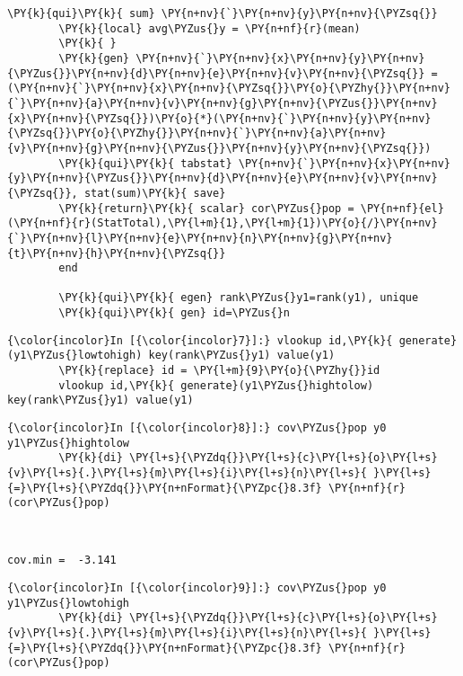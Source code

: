 \documentclass[11pt,notitlepage]{article}\usepackage[]{graphicx}\usepackage[]{color}
\makeatletter
\newenvironment{kframe}{%
 \def\at@end@of@kframe{}%
 \ifinner\ifhmode%
  \def\at@end@of@kframe{\end{minipage}}%
  \begin{minipage}{\columnwidth}%
 \fi\fi%
 \def\FrameCommand##1{\hskip\@totalleftmargin \hskip-\fboxsep
 \colorbox{shadecolor}{##1}\hskip-\fboxsep
     \hskip-\linewidth \hskip-\@totalleftmargin \hskip\columnwidth}%
 \MakeFramed {\advance\hsize-\width
   \@totalleftmargin\z@ \linewidth\hsize
   \@setminipage}}%
 {\par\unskip\endMakeFramed%
 \at@end@of@kframe}
\newenvironment{knitrout}{}{} %
\makeatother
\begin{document}
\begin{knitrout}
\begin{kframe}
\begin{Verbatim}[commandchars=\\\{\}]
        \PY{k}{qui}\PY{k}{ sum} \PY{n+nv}{`}\PY{n+nv}{y}\PY{n+nv}{\PYZsq{}}
        \PY{k}{local} avg\PYZus{}y = \PY{n+nf}{r}(mean)
        \PY{k}{	}
        \PY{k}{gen} \PY{n+nv}{`}\PY{n+nv}{x}\PY{n+nv}{y}\PY{n+nv}{\PYZus{}}\PY{n+nv}{d}\PY{n+nv}{e}\PY{n+nv}{v}\PY{n+nv}{\PYZsq{}} = (\PY{n+nv}{`}\PY{n+nv}{x}\PY{n+nv}{\PYZsq{}}\PY{o}{\PYZhy{}}\PY{n+nv}{`}\PY{n+nv}{a}\PY{n+nv}{v}\PY{n+nv}{g}\PY{n+nv}{\PYZus{}}\PY{n+nv}{x}\PY{n+nv}{\PYZsq{}})\PY{o}{*}(\PY{n+nv}{`}\PY{n+nv}{y}\PY{n+nv}{\PYZsq{}}\PY{o}{\PYZhy{}}\PY{n+nv}{`}\PY{n+nv}{a}\PY{n+nv}{v}\PY{n+nv}{g}\PY{n+nv}{\PYZus{}}\PY{n+nv}{y}\PY{n+nv}{\PYZsq{}})
        \PY{k}{qui}\PY{k}{ tabstat} \PY{n+nv}{`}\PY{n+nv}{x}\PY{n+nv}{y}\PY{n+nv}{\PYZus{}}\PY{n+nv}{d}\PY{n+nv}{e}\PY{n+nv}{v}\PY{n+nv}{\PYZsq{}}, stat(sum)\PY{k}{ save}
        \PY{k}{return}\PY{k}{ scalar} cor\PYZus{}pop = \PY{n+nf}{el}(\PY{n+nf}{r}(StatTotal),\PY{l+m}{1},\PY{l+m}{1})\PY{o}{/}\PY{n+nv}{`}\PY{n+nv}{l}\PY{n+nv}{e}\PY{n+nv}{n}\PY{n+nv}{g}\PY{n+nv}{t}\PY{n+nv}{h}\PY{n+nv}{\PYZsq{}}
        end
        
        \PY{k}{qui}\PY{k}{ egen} rank\PYZus{}y1=rank(y1), unique
        \PY{k}{qui}\PY{k}{ gen} id=\PYZus{}n
\end{Verbatim}

    \begin{Verbatim}[commandchars=\\\{\}]
{\color{incolor}In [{\color{incolor}7}]:} vlookup id,\PY{k}{ generate}(y1\PYZus{}lowtohigh) key(rank\PYZus{}y1) value(y1)
        \PY{k}{replace} id = \PY{l+m}{9}\PY{o}{\PYZhy{}}id
        vlookup id,\PY{k}{ generate}(y1\PYZus{}hightolow) key(rank\PYZus{}y1) value(y1)
\end{Verbatim}

    \begin{Verbatim}[commandchars=\\\{\}]
{\color{incolor}In [{\color{incolor}8}]:} cov\PYZus{}pop y0 y1\PYZus{}hightolow
        \PY{k}{di} \PY{l+s}{\PYZdq{}}\PY{l+s}{c}\PY{l+s}{o}\PY{l+s}{v}\PY{l+s}{.}\PY{l+s}{m}\PY{l+s}{i}\PY{l+s}{n}\PY{l+s}{ }\PY{l+s}{=}\PY{l+s}{\PYZdq{}}\PY{n+nFormat}{\PYZpc{}8.3f} \PY{n+nf}{r}(cor\PYZus{}pop)
\end{Verbatim}

    \begin{Verbatim}[commandchars=\\\{\}]


cov.min =  -3.141

    \end{Verbatim}

    \begin{Verbatim}[commandchars=\\\{\}]
{\color{incolor}In [{\color{incolor}9}]:} cov\PYZus{}pop y0 y1\PYZus{}lowtohigh
        \PY{k}{di} \PY{l+s}{\PYZdq{}}\PY{l+s}{c}\PY{l+s}{o}\PY{l+s}{v}\PY{l+s}{.}\PY{l+s}{m}\PY{l+s}{i}\PY{l+s}{n}\PY{l+s}{ }\PY{l+s}{=}\PY{l+s}{\PYZdq{}}\PY{n+nFormat}{\PYZpc{}8.3f} \PY{n+nf}{r}(cor\PYZus{}pop)
\end{Verbatim}


\end{kframe}
\end{knitrout}
\end{document}
